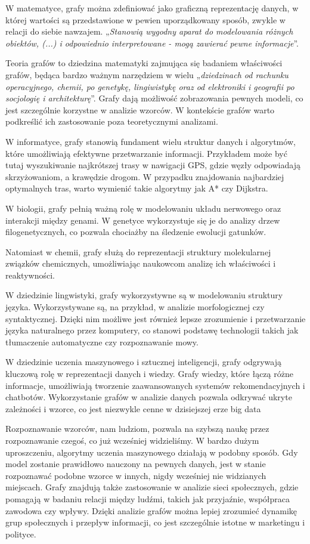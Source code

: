 W matematyce, grafy można zdefiniować jako graficzną reprezentację danych,
w której wartości są przedstawione w pewien uporządkowany sposób, zwykle w relacji do siebie nawzajem.
„\textit{Stanowią wygodny aparat do modelowania różnych obiektów, (...) i odpowiednio interpretowane
- mogą zawierać pewne informacje}”\cite{Wloch2008}.

Teoria grafów to dziedzina matematyki zajmująca się badaniem właściwości grafów,
będąca bardzo ważnym narzędziem w wielu „\textit{dziedzinach od rachunku operacyjnego, chemii, po genetykę, lingiwistykę
oraz od elektroniki i geografii po socjologię i architekturę}”\cite{Wilson2012}.
Grafy dają możliwość zobrazowania pewnych modeli, co jest szczególnie korzystne w analizie wzorców.
W kontekście grafów warto podkreślić ich zastosowanie poza teoretycznymi analizami.

W informatyce, grafy stanowią fundament wielu struktur danych i algorytmów, które umożliwiają efektywne przetwarzanie informacji.
Przykładem może być tutaj wyszukiwanie najkrótszej trasy w nawigacji GPS, gdzie węzły odpowiadają skrzyżowaniom, a krawędzie drogom.
W przypadku znajdowania najbardziej optymalnych tras, warto wymienić takie algorytmy jak A* czy Dijkstra.

W biologii, grafy pełnią ważną rolę w modelowaniu układu nerwowego oraz interakcji między genami.
W genetyce wykorzystuje się je do analizy drzew filogenetycznych, co pozwala chociażby na śledzenie ewolucji gatunków.

Natomiast w chemii, grafy służą do reprezentacji struktury molekularnej związków chemicznych,
umożliwiając naukowcom analizę ich właściwości i reaktywności.

W dziedzinie lingwistyki, grafy wykorzystywne są w modelowaniu struktury języka.
Wykorzystywane są, na przykład, w analizie morfologicznej czy syntaktycznej.
Dzięki nim możliwe jest również lepsze zrozumienie i przetwarzanie języka naturalnego przez komputery,
co stanowi podstawę technologii takich jak tłumaczenie automatyczne czy rozpoznawanie mowy.

W dziedzinie uczenia maszynowego i sztucznej inteligencji, grafy odgrywają kluczową rolę w reprezentacji danych i wiedzy.
Grafy wiedzy, które łączą różne informacje, umożliwiają tworzenie zaawansowanych systemów rekomendacyjnych i chatbotów.
Wykorzystanie grafów w analizie danych pozwala odkrywać ukryte zależności i wzorce, co jest niezwykle cenne w dzisiejszej erze big data

Rozpoznawanie wzorców, nam ludziom, pozwala na szybszą naukę przez rozpoznawanie czegoś, co już wcześniej widzieliśmy.
W bardzo dużym uproszczeniu, algorytmy uczenia maszynowego działają w podobny sposób.
Gdy model zostanie prawidłowo nauczony na pewnych danych, jest w stanie rozpoznawać podobne wzorce w innych,
nigdy wcześniej nie widzianych miejscach.
Grafy znajdują także zastosowanie w analizie sieci społecznych, gdzie pomagają w badaniu relacji między ludźmi,
takich jak przyjaźnie, współpraca zawodowa czy wpływy.
Dzięki analizie grafów można lepiej zrozumieć dynamikę grup społecznych i przepływ informacji,
co jest szczególnie istotne w marketingu i polityce.

